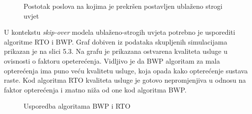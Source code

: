 \documentclass[../zavrsni.tex]{subfiles}
\begin{document}
\begin{figure}[!htb]
    \caption{\label{fig:my-label} Postotak poslova na kojima je prekršen postavljen ublaženo strogi uvjet}
\end{figure}

U kontekstu \textit{skip-over} modela ublaženo-strogih uvjeta potrebno je usporediti algoritme RTO i BWP. Graf dobiven iz podataka skupljenih simulacijama
prikazan je na slici 5.3. Na grafu je prikazana ostvarena kvaliteta usluge u ovisnosti o faktoru opeterećenja.  
Vidljivo je da BWP algoritam za mala 
opterećenja ima puno veću kvalitetu usluge, koja opada kako opterećenje sustava raste. Kod algoritma RTO kvaliteta usluge je gotovo nepromjenjiva
u odnosu na faktor opterećenja i znatno niža od one kod algoritma BWP. 

\begin{figure}[!htb]
    \caption{\label{fig:my-label} Usporedba algoritama BWP i RTO}
\end{figure}
\end{document}
